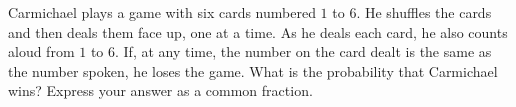 Carmichael plays a game with six cards numbered $1$ to $6$. He shuffles the cards and then deals them face up, one at a time. As he deals each card, he also counts aloud from $1$ to $6$. If, at any time, the number on the card dealt is the same as the number spoken, he loses the game. What is the probability that Carmichael wins? Express your answer as a common fraction.

